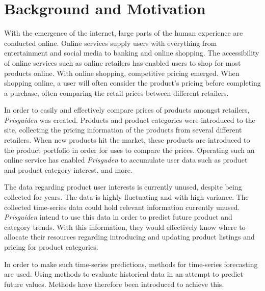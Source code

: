 \section{Background and Motivation}\label{cit}
\label{section:Introduction:BackgroundAndMotivation}

With the emergence of the internet, large parts of the human experience are conducted online.
Online services supply users with everything from entertainment and social media to banking and online shopping.
The accessibility of online services such as online retailers has enabled users to shop for most products online.
With online shopping, competitive pricing emerged.
When shopping online, a user will often consider the product's pricing before completing a purchase, often comparing the retail prices between different retailers.


In order to easily and effectively compare prices of products amongst retailers,
\textit{Prisguiden} was created.
Products and product categories were introduced to the site, collecting the pricing information of the products from several different retailers.
When new products hit the market, these products are introduced to the product portfolio in order for uses to compare the prices.
Operating such an online service has enabled \textit{Prisguden} to accumulate user data such as product and product category interest, and more.

The data regarding product user interests is currently unused, despite being collected for years.
The data is highly fluctuating and with high variance.
The collected time-series data could hold relevant information currently unused.
\textit{Prisguiden} intend to use this data in order to predict future product and category trends.
With this information, they would effectively know where to allocate their resources regarding introducing and updating product listings and pricing for product categories.


In order to make such time-series predictions, methods for time-series forecasting are used.
Using methods to evaluate historical data in an attempt to predict future values.
Methods have therefore been introduced to achieve this.


